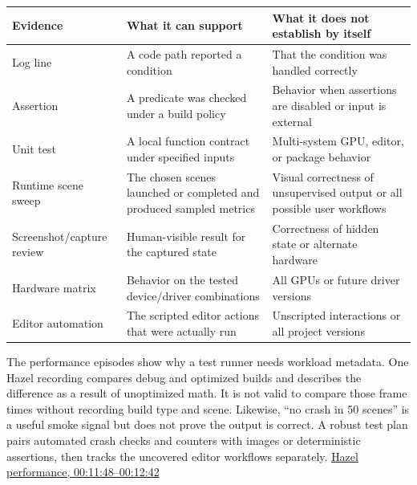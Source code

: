 {\def\LTcaptype{none} %
\begin{longtable}[]{@{}
  >{\raggedright\arraybackslash}p{}
  >{\raggedright\arraybackslash}p{}
  >{\raggedright\arraybackslash}p{}@{}}
\toprule\noalign{}
\begin{minipage}[b]{\linewidth}\raggedright
Evidence
\end{minipage} & \begin{minipage}[b]{\linewidth}\raggedright
What it can support
\end{minipage} & \begin{minipage}[b]{\linewidth}\raggedright
What it does not establish by itself
\end{minipage} \\
\midrule\noalign{}
\endhead
\bottomrule\noalign{}
\endlastfoot
Log line & A code path reported a condition & That the condition was handled correctly \\
Assertion & A predicate was checked under a build policy & Behavior when assertions are disabled or input is external \\
Unit test & A local function contract under specified inputs & Multi-system GPU, editor, or package behavior \\
Runtime scene sweep & The chosen scenes launched or completed and produced sampled metrics & Visual correctness of unsupervised output or all possible user workflows \\
Screenshot/capture review & Human-visible result for the captured state & Correctness of hidden state or alternate hardware \\
Hardware matrix & Behavior on the tested device/driver combinations & All GPUs or future driver versions \\
Editor automation & The scripted editor actions that were actually run & Unscripted interactions or all project versions \\
\end{longtable}
}

The performance episodes show why a test runner needs workload metadata. One Hazel recording compares debug and optimized builds and describes the difference as a result of unoptimized math. It is not valid to compare those frame times without recording build type and scene. Likewise, ``no crash in 50 scenes'' is a useful smoke signal but does not prove the output is correct. A robust test plan pairs automated crash checks and counters with images or deterministic assertions, then tracks the uncovered editor workflows separately. \href{https://www.youtube.com/watch?v=Yw7RpvmqvSE&t=11m48s}{Hazel performance, 00:11:48--00:12:42}

